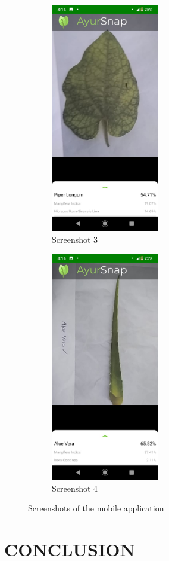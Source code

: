 \begin{figure}[H]
\begin{subfigure}{.5\textwidth}
		\includegraphics[width=0.7\linewidth, height=10cm]{app-screenshot-3.jpeg}
		\caption{Screenshot 3}
		\label{fig:sfig2}
	\end{subfigure}
	\begin{subfigure}{.5\textwidth}
		\centering
		\includegraphics[width=0.7\linewidth, height=10cm]{app-screenshot-4.jpeg}
		\caption{Screenshot 4}
		\label{fig:sfig2}
	\end{subfigure}

\caption{Screenshots of the mobile application}
\label{fig:fig}
\end{figure}

\chapter{CONCLUSION}
